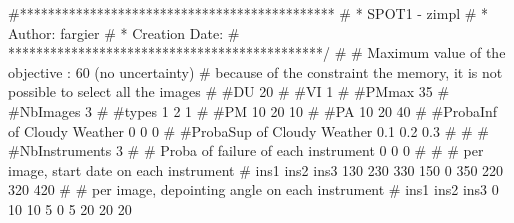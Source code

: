 #*********************************************
# * SPOT1 - zimpl
# * Author: fargier
# * Creation Date:
#  *********************************************/
#
# Maximum value of the objective : 60  (no uncertainty)
# because of the constraint the memory, it is not possible to select all the images
#
#DU
20
#
#VI
1
#
#PMmax
35
#
#NbImages
3
#
#types
1
2
1
#
#PM
10
20
10
#
#PA
10
20
40
#
#ProbaInf of Cloudy Weather
0
0
0
#
#ProbaSup of Cloudy Weather
0.1
0.2
0.3
#
#
#
#NbInstruments
3
#
# Proba of failure of each instrument
0
0
0
#
#
# per image, start date on each instrument
# ins1 ins2 ins3
130 230 330
150 0 350
220 320 420
#
# per image, depointing angle on each instrument
# ins1 ins2 ins3
0 10 10
5 0 5
20 20 20








